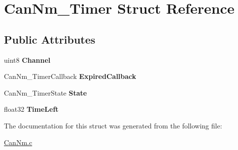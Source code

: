\hypertarget{structCanNm__Timer}{}\section{Can\+Nm\+\_\+\+Timer Struct Reference}
\label{structCanNm__Timer}
\subsection*{Public Attributes}
\begin{DoxyCompactItemize}
\item 
uint8 {\bfseries Channel}\hypertarget{structCanNm__Timer_af9b23a181167d0885c992109abb56a87}{}\label{structCanNm__Timer_af9b23a181167d0885c992109abb56a87}

\item 
Can\+Nm\+\_\+\+Timer\+Callback {\bfseries Expired\+Callback}\hypertarget{structCanNm__Timer_a082346366e3725930a5d18f294e62447}{}\label{structCanNm__Timer_a082346366e3725930a5d18f294e62447}

\item 
Can\+Nm\+\_\+\+Timer\+State {\bfseries State}\hypertarget{structCanNm__Timer_a3803dd9d7e77a1351717775887a6d242}{}\label{structCanNm__Timer_a3803dd9d7e77a1351717775887a6d242}

\item 
float32 {\bfseries Time\+Left}\hypertarget{structCanNm__Timer_a33ff4a3e0d9827cb38e435c52803bcac}{}\label{structCanNm__Timer_a33ff4a3e0d9827cb38e435c52803bcac}

\end{DoxyCompactItemize}


The documentation for this struct was generated from the following file\+:\begin{DoxyCompactItemize}
\item 
\hyperlink{CanNm_8c}{Can\+Nm.\+c}\end{DoxyCompactItemize}
